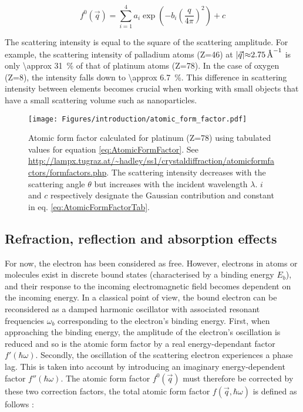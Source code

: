 \begin{equation}
    \label{eq:AtomicFormFactorTab}
    f^0(\vec{q}) = \sum_{i=1}^4 a_i \exp (-b_i (\frac{q} {4\pi})^2) + c
\end{equation}

The scattering intensity is equal to the square of the scattering amplitude.
For example, the scattering intensity of palladium atoms (Z=46) at $|\vec{q}| \qty{\approx 2.75}{\angstrom^{-1}}$ is only \qty{\approx 31}{\percent} of that of platinum atoms (Z=78).
In the case of oxygen (Z=8), the intensity falls down to \qty{\approx 6.7}{\percent}.
This difference in scattering intensity between elements becomes crucial when working with small objects that have a small scattering volume such as nanoparticles.

\begin{figure}[!htb]
    \centering
    \texttt{[image: Figures/introduction/atomic\_form\_factor.pdf]}
    \caption{
    Atomic form factor calculated for platinum (Z=78) using tabulated values \parencite{InterTablesOfCryst} for equation \ref{eq:AtomicFormFactor}.
    See \url{http://lampx.tugraz.at/~hadley/ss1/crystaldiffraction/atomicformfactors/formfactors.php}.
    The scattering intensity decreases with the scattering angle $\theta$ but increases with the incident wavelength $\lambda$. $i$ and $c$ respectively designate the Gaussian contribution and constant in eq. \ref{eq:AtomicFormFactorTab}.
    }
    \label{fig:AtomicFormFactor}
\end{figure}

\subsection{Refraction, reflection and absorption effects}\label{sec:RefractionReflectionAbsorption}

For now, the electron has been considered as free.
However, electrons in atoms or molecules exist in discrete bound states (characterised by a binding energy $E_b$), and their response to the incoming electromagnetic field becomes dependent on the incoming energy.
In a classical point of view, the bound electron can be reconsidered as a damped harmonic oscillator with associated resonant frequencies $\omega_b$ corresponding to the electron's binding energy.
First, when approaching the binding energy, the amplitude of the electron's oscillation is reduced and so is the atomic form factor by a real energy-dependant factor $f'(\hbar\omega)$.
Secondly, the oscillation of the scattering electron experiences a phase lag.
This is taken into account by introducing an imaginary energy-dependent factor $f''(\hbar\omega)$.
The atomic form factor $f^0(\vec{q})$ must therefore be corrected by these two correction factors, the total atomic form factor $f(\vec{q}, \hbar\omega)$ is defined as follows \parencite{NielsenMcMorrow}:

